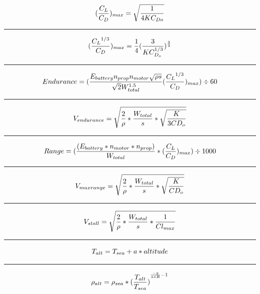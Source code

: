 \documentclass[12pt,A4paper]{article}
\begin{document}
	\begin{equation}
		(\frac{C_L}{C_D})_{max} = \sqrt{\frac{1}{4 K C_{D o}}} \\
	\end{equation}
	\hrule
	\vspace{0.1 in}
	\begin{equation}
		(\frac{{C_L}^{1/3}}{C_D})_{max} = \frac{1}{4} (\frac{3}{K C_{D_o}^{1/3}})^{\frac{3}{4}} \\
	\end{equation}
	\hrule
	\vspace{0.1 in}
	\begin{equation}
		Endurance = (\frac{E_{battery} n_{prop} n_{motor} \sqrt{\rho s}}{\sqrt{2} W_{total}^{1.5}} (\frac{{C_L}^{1/3}}{C_D})_{max}) \div 60 \\
	\end{equation}
	\hrule
	\vspace{0.1 in}
	\begin{equation}
		V_{endurance} = \sqrt{\frac{2}{\rho} * \frac{W_{total}}{s} * \sqrt{\frac{K}{3  CD_o}}} \\
	\end{equation}
	\hrule
	\vspace{0.1 in}
	\begin{equation}
		Range = (\frac{(E_{battery} * n_{motor} * n_{prop})}{W_{total}} * (\frac{C_L}{C_D})_{max}) \div 1000 \\
	\end{equation}
	\hrule
	\vspace{0.1 in}
	\begin{equation}
		V_{maxrange} = \sqrt{\frac{2}{\rho} * \frac{W_{total}}{s} * \sqrt{\frac{K}{CD_o}}}\\
	\end{equation}
	\hrule
	\vspace{0.1 in}
	\begin{equation}
		V_{stall} = \sqrt{\frac{2}{\rho}*\frac{W_{total}}{s}*\frac{1}{Cl_{max}}} \\
	\end{equation}
	\hrule
	\vspace{0.1 in}
	\begin{equation}
		T_{alt} = T_{sea} + a*altitude \\
	\end{equation}
	\hrule
	\vspace{0.1 in}
	\begin{equation}
		\rho_{alt} = \rho_{sea} * {(\frac{T_{alt}}{T_{sea}})}^{\frac{-g}{a*R}-1}\\
	\end{equation}
\end{document}
